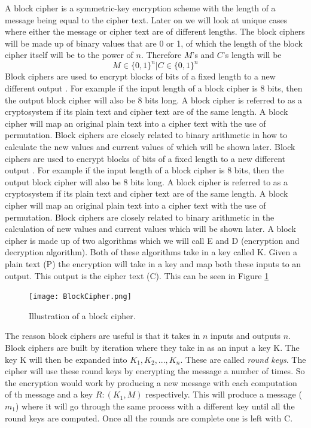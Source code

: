 \documentclass[11pt,a4paper, notitlepage]{report}
\begin{document}
A block cipher is a symmetric-key encryption scheme with the length of a message being equal to the cipher text. Later on we will look at unique cases where either the message or cipher text are of different lengths. The block ciphers will be made up of binary values that are 0 or 1, of which the length of the block cipher itself will be to the power of $n$. Therefore $M$'s and $C$'s length will be 
\begin{displaymath}
M \in \{0,1\}^{n} | C \in \{0,1\}^{n}
\end{displaymath}
Block ciphers are used to encrypt blocks of bits of a fixed length to a new different output \cite{DBLP:books/sp/Buchmann02}. For example if the input length of a block cipher is 8 bits, then the output block cipher will also be 8 bits long. A block cipher is referred to as a cryptosystem if its plain text and cipher text are of the same length. A block cipher will map an original plain text into a cipher text with the use of permutation. Block ciphers are closely related to binary arithmetic in how to calculate the new values and current values of which will be shown later.
Block ciphers are used to encrypt blocks of bits of a fixed length to a new different output \cite{DBLP:books/sp/Buchmann02}. For example if the input length of a block cipher is 8 bits, then the output block cipher will also be 8 bits long. A block cipher is referred to as a cryptosystem if its plain text and cipher text are of the same length. A block cipher will map an original plain text into a cipher text with the use of permutation. Block ciphers are closely related to binary arithmetic in the calculation of new values and current values which will be shown later.
A block cipher is made up of two algorithms which we will call E and D (encryption and decryption algorithm). Both of these algorithms take in a key called K. Given a plain text (P) the encryption will take in a key and map both these inputs to an output. This output is the cipher text (C). This can be seen in Figure \ref*{fig:2.2.1}


\begin{figure}[H]
\centering
\texttt{[image: BlockCipher.png]}
\caption{Illustration of a block cipher.}
\label{fig:2.2.1}
\end{figure}



The reason block ciphers are useful is that it takes in $n$ inputs and outputs $n$. Block ciphers are built by iteration where they take in as an input a key K. The key K will then be expanded into $K_{1}, K_{2},..., K_{n}$. These are called \emph{round keys}. The cipher will use these round keys by encrypting the message a number of times. So the encryption would work by producing a new message with each computation of th message and a key $R: (K_{1}, M)$ respectively. This will produce a message ($m_{1}$) where it will go through the same process with a different key until all the round keys are computed. Once all the rounds are complete one is left with C.
\end{document}
